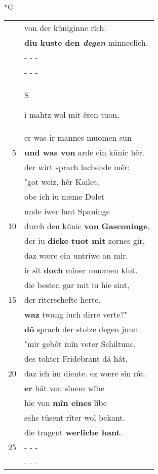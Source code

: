 \documentclass[8pt,a4paper,notitlepage]{article}
\begin{document}
\newpage
\begin{table}[ht]
\begin{minipage}[t]{0.5\linewidth}
\small
\begin{center}*G
\end{center}
\begin{tabular}{rl}
 & von der küniginne rîch.\\ 
 & \textbf{diu kuste den \textit{degen}} minneclîch.\\ 
 & \multicolumn{1}{l}{ - - - }\\ 
 & \multicolumn{1}{l}{ - - - }\\ 
 & \begin{large}S\end{large}i mahtz wol mit êren tuon,\\ 
 & er was ir mannes muomen sun\\ 
5 & \textbf{und was von} arde ein künic hêr.\\ 
 & der wirt sprach lachende mêr:\\ 
 & "got weiz, hêr Kailet,\\ 
 & obe ich iu næme Dolet\\ 
 & unde iwer lant Spaninge\\ 
10 & durch den künic \textbf{von} \textbf{Gasconinge},\\ 
 & der iu \textbf{dicke tuot mit} zornes gir,\\ 
 & daz wære ein untriwe an mir.\\ 
 & ir sît \textbf{doch} mîner muomen kint.\\ 
 & die besten gar mit iu hie sint,\\ 
15 & der rîterschefte herte.\\ 
 & \textbf{waz} twang iuch dirre verte?"\\ 
 & \textbf{dô} sprach der stolze degen junc:\\ 
 & "mir gebôt mîn veter Schiltunc,\\ 
 & des tohter Fridebrant dâ hât,\\ 
20 & daz ich im diente. ez wære sîn rât.\\ 
 & \textbf{er} hât von sînem wîbe\\ 
 & hie von \textbf{mîn eines} lîbe\\ 
 & sehs tûsent rîter wol bekant.\\ 
 & die tragent \textbf{werlîche hant}.\\ 
25 & \multicolumn{1}{l}{ - - - }\\ 
 & \multicolumn{1}{l}{ - - - }\\ 

\end{tabular}
\end{minipage}
\end{table}
\end{document}
